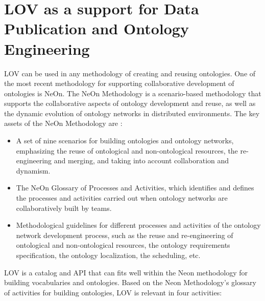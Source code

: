 \documentclass{iosart2c}
\begin{document}
\section{LOV as a support for Data Publication and Ontology Engineering}
\label{sec:dataPubOntoEngine}


LOV can be used in any methodology of creating and reusing ontologies. One of the most recent methodology for supporting collaborative development of ontologies is NeOn.  
The NeOn Methodology is a scenario-based methodology that supports the collaborative aspects of ontology development and reuse, as well as the dynamic evolution of ontology networks in distributed environments. The key assets of the NeOn Methodology are \cite{MC10}:
\begin{itemize}
 \item  A set of nine scenarios for building ontologies and ontology networks, emphasizing the reuse of ontological and non-ontological resources, the re-engineering and merging, and taking into account collaboration and dynamism.
 \item The NeOn Glossary of Processes and Activities, which identifies and defines the processes and activities carried out when ontology networks are collaboratively built by teams.
 \item Methodological guidelines for different processes and activities of the ontology network development process, such as the reuse and re-engineering of ontological and non-ontological resources, the ontology requirements specification, the ontology localization, the scheduling, etc.
\end{itemize}


LOV is a catalog and API that can fits well within the Neon methodology for building vocabularies and ontologies. Based on the Neon Methodology's glossary of activities for building ontologies, LOV is relevant in four activities:
\end{document}
